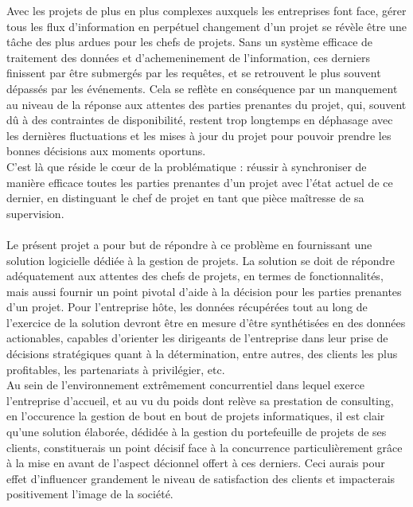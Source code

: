 \begin{spacing}{1.5}
Avec les projets de plus en plus complexes auxquels les entreprises font face, gérer tous les flux d'information en perpétuel changement d'un projet se révèle être une tâche des plus ardues pour les chefs de projets. Sans un système efficace de traitement des données et d'achemeninement de l'information, ces derniers finissent par être submergés par les requêtes, et se retrouvent le plus souvent dépassés par les événements. Cela se reflète en conséquence par un manquement au niveau de la réponse aux attentes des parties prenantes du projet, qui, souvent dû à des contraintes de disponibilité, restent trop longtemps en déphasage avec les dernières fluctuations et les mises à jour du projet pour pouvoir prendre les bonnes décisions aux moments oportuns.\\
C'est là que réside le cœur de la problématique : réussir à synchroniser de manière efficace toutes les parties prenantes d'un projet avec l'état actuel de ce dernier, en distinguant le chef de projet en tant que pièce maîtresse de sa supervision.\\
\\
Le présent projet a pour but de répondre à ce problème en fournissant une solution logicielle dédiée à la gestion de projets. La solution se doit de répondre adéquatement aux attentes des chefs de projets, en termes de fonctionnalités, mais aussi fournir un point pivotal d'aide à la décision pour les parties prenantes d'un projet. Pour l'entreprise hôte, les données récupérées tout au long de l'exercice de la solution devront être en mesure d'être synthétisées en des données actionables, capables d'orienter les dirigeants de l'entreprise dans leur prise de décisions stratégiques quant à la détermination, entre autres, des clients les plus profitables, les partenariats à privilégier, etc.\\

Au sein de l'environnement extrêmement concurrentiel dans lequel exerce l'entreprise d'accueil, et au vu du poids dont relève sa prestation de consulting, en l'occurence la gestion de bout en bout de projets informatiques, il est clair qu'une solution élaborée, dédidée à la gestion du portefeuille de projets de ses clients, constituerais un point décisif face à la concurrence particulièrement grâce à la mise en avant de l'aspect décionnel offert à ces derniers. Ceci aurais pour effet d'influencer grandement le niveau de satisfaction des clients et impacterais positivement l'image de la société.\\


\end{spacing}
